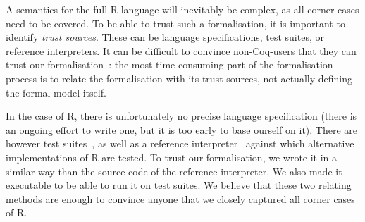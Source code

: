 \documentclass[9pt, sigplan, natbib=false, screen=true]{acmart}
\newcommand\Coq{Coq}
\newcommand\R{R}
\begin{document}
A semantics for the full \R{} language will inevitably be complex,
as all corner cases need to be covered.
%
To be able to trust such a formalisation,
it is important to identify \emph{trust sources}.
These can be language specifications,
test suites,
or reference interpreters.
%
It can be difficult to convince non-\Coq{}-users
that they can trust our formalisation~\parencite{leroy2014pip}:
the most time-consuming part of the formalisation process is to
relate the formalisation with its trust sources,
not actually defining the formal model itself.




In the case of \R{}, there is unfortunately
no precise language specification
(there is an ongoing effort to write one,
but it is too early to base ourself on it).
There are however test suites~\parencite{2014testr, maj2013testr},
as well as a reference interpreter~\parencite{Rwebsite}
against which alternative implementations of \R{} are tested.
%
To trust our formalisation, we wrote it in a similar
way than the source code of the reference interpreter.
We also made it executable to be able to run it on test suites.
We believe that these two relating methods are enough
to convince anyone that we closely captured all corner cases of \R{}.
\end{document}

